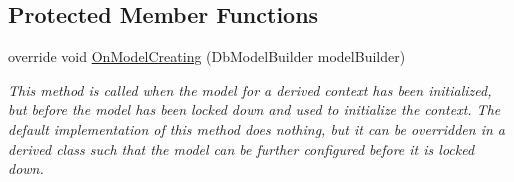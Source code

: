\subsection*{Protected Member Functions}
\begin{DoxyCompactItemize}
\item 
override void \hyperlink{class_open_1_1_g_i_1_1hypermart_1_1_d_a_l_1_1_hypermart_context_a1a255d0b197dd90f76233146c608a0f1}{On\+Model\+Creating} (Db\+Model\+Builder model\+Builder)
\begin{DoxyCompactList}\small\item\em This method is called when the model for a derived context has been initialized, but before the model has been locked down and used to initialize the context. The default implementation of this method does nothing, but it can be overridden in a derived class such that the model can be further configured before it is locked down. \end{DoxyCompactList}\end{DoxyCompactItemize}
